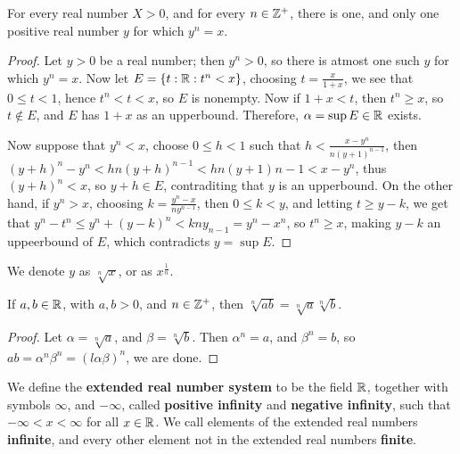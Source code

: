 \begin{theorem}\label{1.3.4}
    For every real number $X>0$, and for every  $n \in \mathbb{Z}^+$, there is one, and only one
    positive real number  $y$ for which  $y^n=x$.
\end{theorem}
\begin{proof}
    Let $y>0$ be a real number; then $y^n>0$, so there is atmost one such  $y$ for which
    $y^n=x$. Now let  $E=\{t:\mathbb{R}: t^n<x\}$, choosing  $t=\frac{x}{1+x}$, we see that
    $0 \leq t<1$, hence  $t^n<t<x$, so $E$ is nonempty. Now if $1+x<t$, then $t^n \geq x$, so
    $t \notin E$, and  $E$ has $1+x$ as an upperbound. Therefore, $\alpha=\sup{E} \in \mathbb{R}$ exists.

    Now suppose that  $y^n<x$, choose  $0 \leq h<1$ such that  $h<\frac{x-y^n}{n(y+1)^{n-1}}$,
    then $(y+h)^n-y^n<hn(y+h)^{n-1}<hn(y+1)^{}n-1<x-y^n$, thus  $(y+h)^n<x$, so  $y+h \in E$,
    contraditing that  $y$ is an upperbound. On the other hand, if  $y^n>x$, choosing
    $k=\frac{y^n-x}{ny^{n-1}}$, then $0 \leq k<y$, and letting  $t \geq y-k$, we get that
    $y^n-t^n \leq y^n+(y-k)^n<kny_{n-1}=y^n-x^n$, so $t^n \geq x$, making  $y-k$ an uppeerbound
    of  $E$, which contradicts  $y=\sup{E}$.
\end{proof}
\begin{remark}
    We denote $y$ as  $\sqrt[n]{x}$, or as  $x^{\frac{1}{n}}$.
\end{remark}

\begin{corollary}
    If $a,b \in \mathbb{R}$, with  $a,b>0$, and  $n \in \mathbb{Z}^+$, then  $\sqrt[n]{ab}=\sqrt[n]{a}\sqrt[n]{b}$.
\end{corollary}
\begin{proof}
    Let $\alpha=\sqrt[n]{a}$, and  $\beta=\sqrt[n]{b}$. Then  $\alpha^n=a$, and  $\beta^n=b$, so
    $ab=\alpha^n\beta^n=(l\alpha\beta)^n$, we are done.
\end{proof}

\begin{definition}
    We define the \textbf{extended real number system} to be the field $\mathbb{R}$, together with symbols
    $\infty$, and  $-\infty$, called  \textbf{positive infinity} and \textbf{negative infinity}, such that
    $-\infty<x<\infty$ for all $x \in \mathbb{R}$. We call elements of the extended real numbers \textbf{infinite},
    and every other element not in the extended real numbers \textbf{finite}.
\end{definition}

